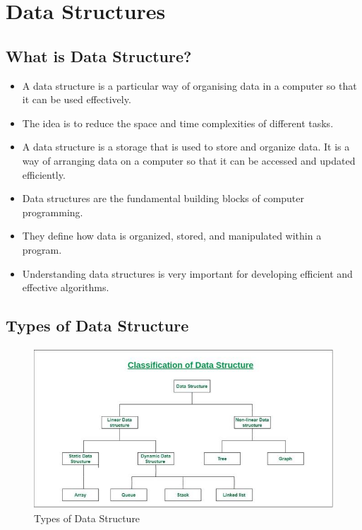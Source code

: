 \chapter{Data Structures \cite{gfg-data-structures}}\label{Data Structures}

\section{What is Data Structure? \cite{gfg-introduction-to-data-structures}}
\begin{itemize}
    \item A data structure is a particular way of organising data in a computer so that it can be used effectively. 
    
    \item The idea is to reduce the space and time complexities of different tasks. 

    \item A data structure is a storage that is used to store and organize data. It is a way of arranging data on a computer so that it can be accessed and updated efficiently.

    \item Data structures are the fundamental building blocks of computer programming. 
    
    \item They define how data is organized, stored, and manipulated within a program. 
    
    \item Understanding data structures is very important for developing efficient and effective algorithms.
\end{itemize}


\section{Types of Data Structure \cite{gfg-introduction-to-data-structures}}

\begin{figure}[h]
    \centering
    \includegraphics[width=0.5\linewidth,height=6cm,keepaspectratio]{Pictures/ds-algo/ClassificationofDataStructures.jpg}
    \caption{Types of Data Structure}
\end{figure}

